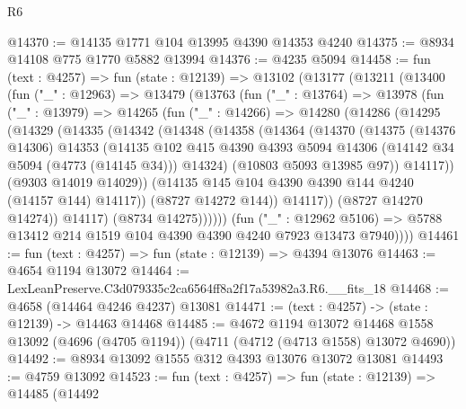 \begin{lexlean}{R6}
\begin{coremodule}
@14370 := @14135 @1771 @104 @13995 @4390 @14353 @4240
@14375 := @8934 @14108 @775 @1770 @5882 @13994
@14376 := @4235 @5094
@14458 := fun (text : @4257) =>
  fun (state : @12139) =>
  @13102
    (@13177
      (@13211
        (@13400
          (fun ("_" : @12963) =>
          @13479
            (@13763
              (fun ("_" : @13764) =>
              @13978
                (fun ("_" : @13979) =>
                @14265
                  (fun ("_" : @14266) =>
                  @14280
                    (@14286
                      (@14295
                        (@14329
                          (@14335
                            (@14342
                              (@14348
                                (@14358
                                  (@14364
                                    (@14370
                                      (@14375
                                        (@14376 @14306)
                                        @14353
                                        (@14135
                                          @102
                                          @415
                                          @4390
                                          @4393
                                          @5094
                                          @14306
                                          (@14142 @34 @5094 (@4773 (@14145 @34)))
                                          @14324)
                                        (@10803 @5093 @13985 @97))
                                      @14117))
                                  (@9303 @14019 @14029))
                                (@14135 @145 @104 @4390 @4390 @144 @4240 (@14157 @144) @14117))
                              (@8727 @14272 @144))
                            @14117))
                        (@8727 @14270 @14274))
                      @14117)
                    (@8734 @14275))))))
          (fun ("_" : @12962 @5106) =>
          @5788 @13412 @214 @1519 @104 @4390 @4390 @4240 @7923 @13473 @7940))))
@14461 := fun (text : @4257) => fun (state : @12139) => @4394 @13076
@14463 := @4654 @1194 @13072
@14464 := LexLeanPreserve.C3d079335c2ca6564ff8a2f17a53982a3.R6.__fits_18
@14468 := @4658 (@14464 @4246 @4237) @13081
@14471 := (text : @4257) -> (state : @12139) -> @14463 @14468
@14485 := @4672
    @1194
    @13072
    @14468
    @1558
    @13092
    (@4696 (@4705 @1194))
    (@4711 (@4712 (@4713 @1558) @13072 @4690))
@14492 := @8934 @13092 @1555 @312 @4393 @13076 @13072 @13081
@14493 := @4759 @13092
@14523 := fun (text : @4257) =>
  fun (state : @12139) =>
  @14485
    (@14492

\end{coremodule}
\end{lexlean}
